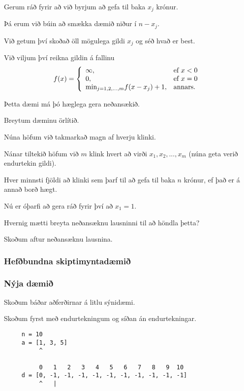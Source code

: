 {
	{
		\item<1-> Gerum ráð fyrir að við byrjum að gefa til baka $x_j$ krónur.
		\item<2-> Þá erum við búin að smækka dæmið niður í $n - x_j$.
		\item<3-> Við getum því skoðað öll mögulega gildi $x_j$ og séð hvað er best.
		\item<4-> Við viljum því reikna gildin á fallinu
		\[
			f(x) = 
			\left \{
			\env{array}
			{
				{l l}
				\infty, & \text{ef $x < 0$}\\
				0, & \text{ef $x = 0$}\\
				\text{min}_{j = 1, 2, ..., m} f(x - x_j) + 1, & \text{annars}.
			}
			\right .
		\]
	}
}

{
}

{
	{
		\item<1-> Þetta dæmi má þó hæglega gera neðansækið.
	}
}

{
}

{
	{
		\item<1-> Breytum dæminu örlítið.
		\item<2-> Núna höfum við takmarkað magn af hverju klinki.
		\item<3-> Nánar tiltekið höfum við $m$ klink hvert að virði $x_1, x_2, ..., x_m$ (núna geta verið endurtekin gildi).
		\item<4-> Hver minnsti fjöldi að klinki sem þarf til að gefa til baka $n$ krónur, ef það er á annað borð hægt.
		\item<5-> Nú er óþarfi að gera ráð fyrir því að $x_1 = 1$.
		\item<6-> Hvernig mætti breyta neðansæknu lausninni til að höndla þetta?
		\item<7-> Skoðum aftur neðansæknu lausnina.
	}
}

{
	\frametitle{Hefðbundna skiptimyntadæmið}
}

{
	\frametitle{Nýja dæmið}
}

{
	{
		\item<1-> Skoðum báðar aðferðirnar á litlu sýnidæmi.
		\item<2-> Skoðum fyrst með endurtekningum og síðan án endurtekningar.
	}
}

\begin{frame}[fragile]
\begin{verbatim}
     n = 10
     a = [1, 3, 5]
          ^

          0   1   2   3   4   5   6   7   8   9  10
     d = [0, -1, -1, -1, -1, -1, -1, -1, -1, -1, -1]
          ^   |
\end{verbatim}
\end{frame}
\addtocounter{framenumber}{-1}

